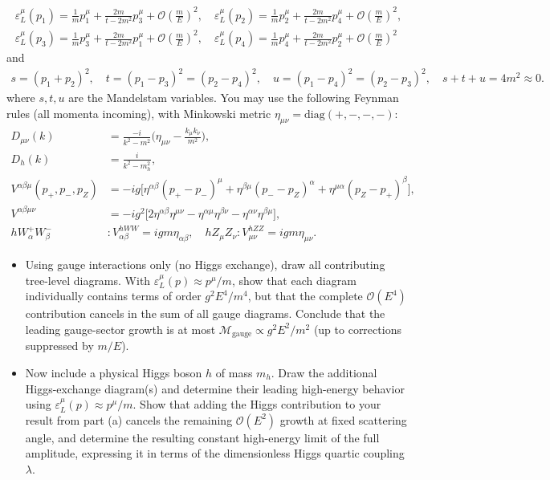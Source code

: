 \begin{align}
    \varepsilon_L^\mu(p_1) = \frac{1}{m}p_1^\mu +\frac{2m}{t-2m^2}p_3^\mu+\mathcal{O}(\frac{m}{E})^2,\quad \varepsilon_L^\mu(p_2) = \frac{1}{m}p_2^\mu +\frac{2m}{t-2m^2}p_4^\mu +\mathcal{O}(\frac{m}{E})^2,\\
    \varepsilon_L^\mu(p_3) = \frac{1}{m}p_3^\mu +\frac{2m}{t-2m^2}p_1^\mu +\mathcal{O}(\frac{m}{E})^2,\quad \varepsilon_L^\mu(p_4) = \frac{1}{m}p_4^\mu +\frac{2m}{t-2m^2}p_2^\mu +\mathcal{O}(\frac{m}{E})^2
\end{align}
and
\begin{align}
    s=(p_1+p_2)^2,\quad t=(p_1-p_3)^2= (p_2-p_4)^2,\quad u=(p_1-p_4)^2=(p_2-p_3)^2, \quad s+t+u=4m^2\approx 0.
\end{align}
where $s,t,u$ are the Mandelstam variables. You may use the following Feynman rules (all momenta incoming), with Minkowski metric $\eta_{\mu\nu}=\text{diag}(+,-,-,-)$:
\begin{align}
    D_{\mu\nu}(k)&=\frac{-i}{k^2-m^2}\Big(\eta_{\mu\nu} -\frac{k_\mu k_\nu}{m^2}\Big),\\
    D_h(k) &= \frac{i}{k^2 - m_h^2},\\
    V^{\alpha\beta\mu}(p_+,p_-,p_Z)&=-ig \Big[\eta^{\alpha\beta}(p_+-p_-)^\mu +\eta^{\beta\mu}(p_--p_Z)^\alpha +\eta^{\mu\alpha}(p_Z-p_+)^\beta \Big],\\
    V^{\alpha\beta\mu\nu} &= -ig^2 \Big[2\eta^{\alpha\beta}\eta^{\mu\nu} -\eta^{\alpha\mu}\eta^{\beta\nu} -\eta^{\alpha\nu}\eta^{\beta\mu} \Big],\\
    hW_\alpha^+ W_\beta^- &:V^{hWW}_{\alpha\beta}= igm\eta_{\alpha\beta},\quad hZ_\mu Z_\nu :V^{hZZ}_{\mu\nu} =igm\eta_{\mu\nu}.
\end{align}

\begin{itemize}
    \item [(a)] Using gauge interactions only (no Higgs exchange), draw all contributing tree-level diagrams. With $\varepsilon_L^\mu(p) \approx p^\mu/m$, show that each diagram individually contains terms of order $g^2 E^4/m^4$, but that the complete $\mathcal{O}(E^4)$ contribution cancels in the sum of all gauge diagrams. Conclude that the leading gauge-sector growth is at most $\mathcal{M}_{\text{gauge}}\propto g^2 E^2/m^2$ (up to corrections suppressed by $m/E$).
    \item [(b)] Now include a physical Higgs boson $h$ of mass $m_h$. Draw the additional Higgs-exchange diagram(s) and determine their leading high-energy behavior using $\varepsilon_L^\mu(p) \approx p^\mu/m$. Show that adding the Higgs contribution to your result from part (a) cancels the remaining $\mathcal{O}(E^2)$ growth at fixed scattering angle, and determine the resulting constant high-energy limit of the full amplitude, expressing it in terms of the dimensionless Higgs quartic coupling $\lambda$.
\end{itemize}


